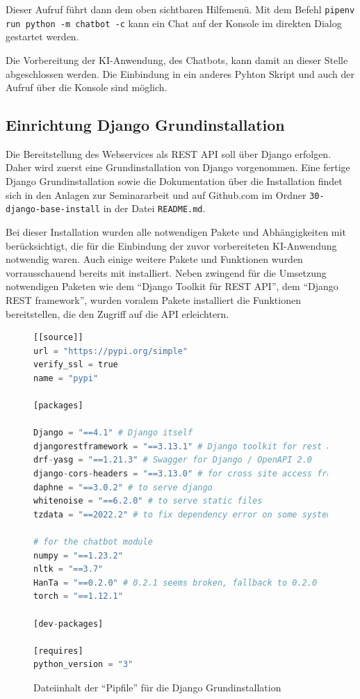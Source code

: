 \documentclass[12pt,oneside,titlepage,listof=totoc,bibliography=totoc]{scrartcl}
\newcommand{\code}[1]{\colorbox{code-gray}{\texttt{#1}}}
\begin{document}
Dieser Aufruf führt dann dem oben sichtbaren Hilfemenü. Mit dem Befehl \code{pipenv run python -m chatbot -c} kann ein Chat auf der Konsole im direkten Dialog gestartet werden. 

Die Vorbereitung der KI-Anwendung, des Chatbots, kann damit an dieser Stelle abgeschlossen werden. Die Einbindung in ein anderes Pyhton Skript und auch der Aufruf über die Konsole sind möglich.
	


\subsection{Einrichtung Django Grundinstallation}

Die Bereitstellung des Webservices als REST API soll über Django erfolgen. Daher wird zuerst eine Grundinstallation von Django vorgenommen. Eine fertige Django Grundinstallation sowie die Dokumentation über die Installation findet sich in den Anlagen zur Seminararbeit und auf Github.com im Ordner \code{30-django-base-install} in der Datei \code{README.md}.

Bei dieser Installation wurden alle notwendigen Pakete und Abhängigkeiten mit berücksichtigt, die für die Einbindung der zuvor vorbereiteten KI-Anwendung notwendig waren. Auch einige weitere Pakete und Funktionen wurden vorrausschauend bereits mit installiert. Neben zwingend für die Umsetzung notwendigen Paketen wie dem \enquote{Django Toolkit für REST API}, dem \enquote{Django REST framework}, wurden voralem Pakete installiert die Funktionen bereitstellen, die den Zugriff auf die API erleichtern. 


\begin{figure}[H]
	\caption{Dateiinhalt der \enquote{Pipfile} für die Django Grundinstallation}
	\label{fig:code-nn-basis}
\begin{lstlisting}[language=python]
[[source]]
url = "https://pypi.org/simple"
verify_ssl = true
name = "pypi"

[packages]

Django = "==4.1" # Django itself 
djangorestframework = "==3.13.1" # Django toolkit for rest api
drf-yasg = "==1.21.3" # Swagger for Django / OpenAPI 2.0 
django-cors-headers = "==3.13.0" # for cross site access from a frontend
daphne = "==3.0.2" # to serve django 
whitenoise = "==6.2.0" # to serve static files
tzdata = "==2022.2" # to fix dependency error on some systems

# for the chatbot module
numpy = "==1.23.2" 
nltk = "==3.7"
HanTa = "==0.2.0" # 0.2.1 seems broken, fallback to 0.2.0
torch = "==1.12.1"

[dev-packages]

[requires]
python_version = "3"
\end{lstlisting}
\end{figure}
\end{document}
